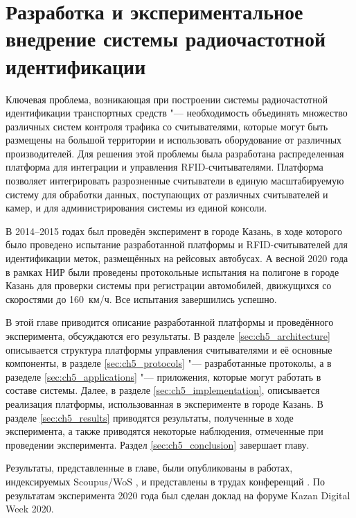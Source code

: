 \chapter{Разработка и экспериментальное внедрение системы радиочастотной идентификации}\label{ch:ch5}
Ключевая проблема, возникающая при построении системы радиочастотной идентификации транспортных средств "--- необходимость объединять множество различных систем контроля трафика со считывателями, которые могут быть размещены на большой территории и использовать оборудование от различных производителей. Для решения этой проблемы была разработана распределенная платформа для интеграции и управления RFID-считывателями. Платформа позволяет интегрировать разрозненные считыватели в единую масштабируемую систему для обработки данных, поступающих от различных считывателей и камер, и для администрирования системы из единой консоли.

В 2014--2015 годах был проведён эксперимент в городе Казань, в ходе которого было проведено испытание разработанной платформы и RFID-считывателей для идентификации меток, размещённых на рейсовых автобусах. А весной 2020 года в рамках НИР были проведены протокольные испытания на полигоне в городе Казань для проверки системы при регистрации автомобилей, движущихся со скоростями до 160~км/ч. Все испытания завершились успешно.

В этой главе приводится описание разработанной платформы и проведённого эксперимента, обсуждаются его результаты. В разделе \ref{sec:ch5_architecture} описывается структура платформы управления считывателями и её основные компоненты, в разделе \ref{sec:ch5_protocols} "--- разработанные протоколы, а в разеделе \ref{sec:ch5_applications} "--- приложения, которые могут работать в составе системы. Далее, в разделе \ref{sec:ch5_implementation}, описывается реализация платформы, использованная в эксперименте в городе Казань. В разделе \ref{sec:ch5_results} приводятся результаты, полученные в ходе эксперимента, а также приводятся некоторые наблюдения, отмеченные при проведении эксперимента. Раздел \ref{sec:ch5_conclusion} завершает главу.

Результаты, представленные в главе, были опубликованы в работах, индексируемых Scoupus/WoS \cite{RFIDCTRL_NETS2CARS2014, RFIDTA2012}, и представлены в трудах конференций \cite{RFIDCTRL_DCCN2017, RFIDCTRL_VSPU2014}. По результатам эксперимента 2020 года был сделан доклад на форуме Kazan Digital Week 2020.


